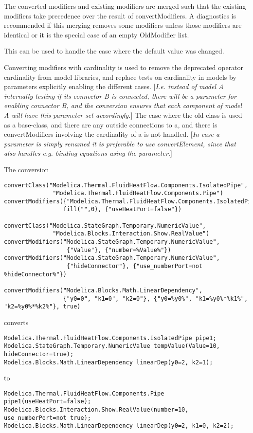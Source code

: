 The converted modifiers and existing modifiers are merged such that the existing modifiers take precedence over the result of convertModifiers.
A diagnostics is recommended if this merging removes some modifiers unless those modifiers are identical or it is the special case of an empty OldModifier list.
\begin{nonnormative}
This can be used to handle the case where the default value was changed.
\end{nonnormative}

Converting modifiers with cardinality is used to remove the deprecated
operator cardinality from model libraries, and replace tests on
cardinality in models by parameters explicitly enabling the different
cases. {[}\emph{I.e. instead of model A internally testing if its
connector B is connected, there will be a parameter for enabling
connector B, and the conversion ensures that each component of model A
will have this parameter set accordingly.}{]} The case where the old
class is used as a base-class, and there are any outside connections to
a, and there is convertModifiers involving the cardinality of a is not
handled. {[}\emph{In case a parameter is simply renamed it is preferable
to use convertElement, since that also handles e.g. binding equations
using the parameter.}{]}

\begin{example}
The conversion
\begin{lstlisting}[language=modelica]
convertClass("Modelica.Thermal.FluidHeatFlow.Components.IsolatedPipe",
              "Modelica.Thermal.FluidHeatFlow.Components.Pipe")
convertModifiers({"Modelica.Thermal.FluidHeatFlow.Components.IsolatedPipe"},
                 fill("",0), {"useHeatPort=false"})

convertClass("Modelica.StateGraph.Temporary.NumericValue",
              "Modelica.Blocks.Interaction.Show.RealValue")
convertModifiers("Modelica.StateGraph.Temporary.NumericValue",
                  {"Value"}, {"number=%Value%"})
convertModifiers("Modelica.StateGraph.Temporary.NumericValue",
                  {"hideConnector"}, {"use_numberPort=not %hideConnector%"})

convertModifiers("Modelica.Blocks.Math.LinearDependency",
                 {"y0=0", "k1=0", "k2=0"}, {"y0=%y0%", "k1=%y0%*%k1%", "k2=%y0%*%k2%"}, true)
\end{lstlisting}
converts
\begin{lstlisting}[language=modelica]
Modelica.Thermal.FluidHeatFlow.Components.IsolatedPipe pipe1;
Modelica.StateGraph.Temporary.NumericValue tempValue(Value=10, hideConnector=true);
Modelica.Blocks.Math.LinearDependency linearDep(y0=2, k2=1);
\end{lstlisting}
to
\begin{lstlisting}[language=modelica]
Modelica.Thermal.FluidHeatFlow.Components.Pipe pipe1(useHeatPort=false);
Modelica.Blocks.Interaction.Show.RealValue(number=10, use_numberPort=not true);
Modelica.Blocks.Math.LinearDependency linearDep(y0=2, k1=0, k2=2);
\end{lstlisting}
\end{example}

